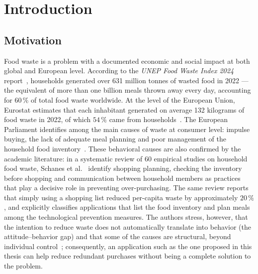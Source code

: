 \section{Introduction}\label{cap:introducere}

\subsection{Motivation}\label{sec:motivatia-intro}
Food waste is a problem with a documented economic and social impact at both global and European level.
According to the \textit{UNEP Food Waste Index 2024} report~\cite{unepFoodWaste2024}, households generated over 631 million tonnes of wasted food in 2022 --- the equivalent of more than one billion meals thrown away every day, accounting for \(60\,\%\) of total food waste worldwide.
At the level of the European Union, Eurostat estimates that each inhabitant generated on average 132 kilograms of food waste in 2022, of which \(54\,\%\) came from households~\cite{eurostatFoodWaste2024}.
The European Parliament identifies among the main causes of waste at consumer level: impulse buying, the lack of adequate meal planning and poor management of the household food inventory~\cite{europarlFoodWaste2025}.
These behavioral causes are also confirmed by the academic literature: in a systematic review of 60 empirical studies on household food waste, Schanes et al.~\cite{schanes2018} identify shopping planning, checking the inventory before shopping and communication between household members as practices that play a decisive role in preventing over-purchasing.
The same review reports that simply using a shopping list reduced per-capita waste by approximately \(20\,\%\), and explicitly classifies applications that list the food inventory and plan meals among the technological prevention measures.
The authors stress, however, that the intention to reduce waste does not automatically translate into behavior (the attitude--behavior gap) and that some of the causes are structural, beyond individual control~\cite{schanes2018}; consequently, an application such as the one proposed in this thesis can help reduce redundant purchases without being a complete solution to the problem.

